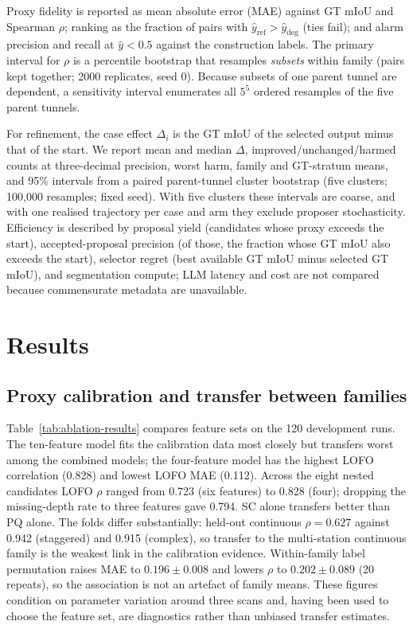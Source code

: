 \documentclass[a4paper,fleqn]{cas-dc}
\begin{document}
Proxy fidelity is reported as mean absolute error (MAE) against GT mIoU and Spearman $\rho$; ranking as the fraction of pairs with $\hat y_{\mathrm{ref}}>\hat y_{\mathrm{deg}}$ (ties fail); and alarm precision and recall at $\hat y<0.5$ against the construction labels. The primary interval for $\rho$ is a percentile bootstrap that resamples \emph{subsets} within family (pairs kept together; 2000 replicates, seed 0). Because subsets of one parent tunnel are dependent, a sensitivity interval enumerates all $5^5$ ordered resamples of the five parent tunnels.

For refinement, the case effect $\Delta_i$ is the GT mIoU of the selected output minus that of the start. We report mean and median $\Delta$, improved/unchanged/harmed counts at three-decimal precision, worst harm, family and GT-stratum means, and 95\% intervals from a paired parent-tunnel cluster bootstrap (five clusters; 100{,}000 resamples; fixed seed). With five clusters these intervals are coarse, and with one realised trajectory per case and arm they exclude proposer stochasticity. Efficiency is described by proposal yield (candidates whose proxy exceeds the start), accepted-proposal precision (of those, the fraction whose GT mIoU also exceeds the start), selector regret (best available GT mIoU minus selected GT mIoU), and segmentation compute; LLM latency and cost are not compared because commensurate metadata are unavailable.

\section{Results}\label{sec:results}

\subsection{Proxy calibration and transfer between families}\label{sec:main-results}

Table~\ref{tab:ablation-results} compares feature sets on the 120 development runs. The ten-feature model fits the calibration data most closely but transfers worst among the combined models; the four-feature model has the highest LOFO correlation (0.828) and lowest LOFO MAE (0.112). Across the eight nested candidates LOFO $\rho$ ranged from 0.723 (six features) to 0.828 (four); dropping the missing-depth rate to three features gave 0.794. SC alone transfers better than PQ alone. The folds differ substantially: held-out continuous $\rho=0.627$ against 0.942 (staggered) and 0.915 (complex), so transfer to the multi-station continuous family is the weakest link in the calibration evidence. Within-family label permutation raises MAE to $0.196\pm0.008$ and lowers $\rho$ to $0.202\pm0.089$ (20 repeats), so the association is not an artefact of family means. These figures condition on parameter variation around three scans and, having been used to choose the feature set, are diagnostics rather than unbiased transfer estimates.
\end{document}
